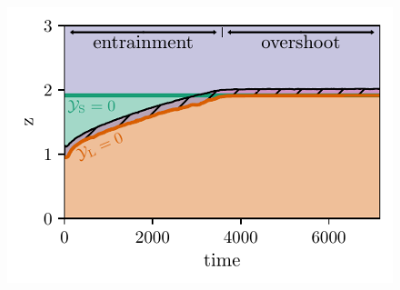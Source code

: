 \begin{figure}[t]
\centering
\includegraphics[width=\columnwidth]{kippenhahn.pdf}
\caption{
\label{fig:kippenhahn}
}
\end{figure}


